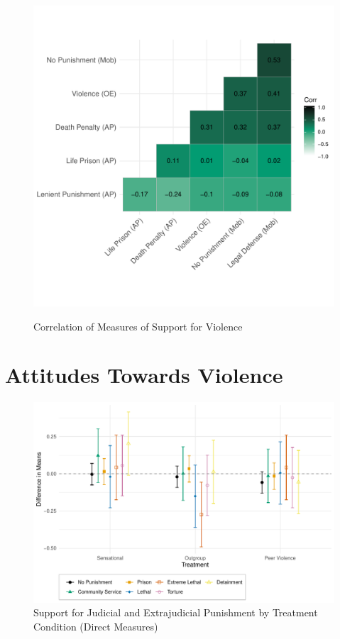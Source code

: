 \documentclass[]{article}
\begin{document}
\begin{figure}[H]
  \centering
  \caption{Correlation of Measures of Support for Violence}
  \vspace{1em}
  \includegraphics[width=.7\textwidth]{figures/corr_plot.pdf}\\
\end{figure}





%
%
%


\section{Attitudes Towards Violence}\vspace{-1em}

\begin{figure}[!htbp]
  \centering
  \caption{Support for Judicial and Extrajudicial Punishment by Treatment Condition (Direct Measures)}
  \includegraphics[width=\textwidth]{figures/ATE_punish_hom_outcomes.pdf}
\end{figure}
\end{document}
